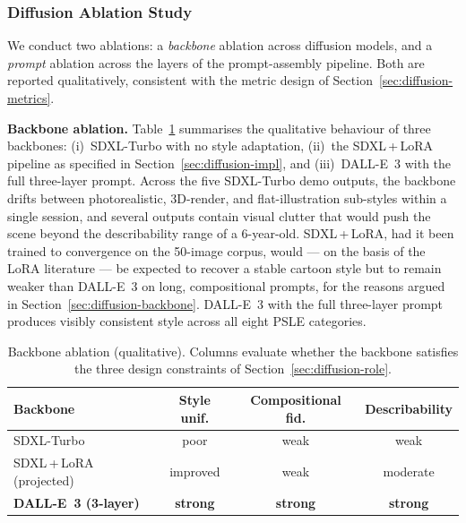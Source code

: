 \documentclass{article}
\begin{document}
\subsubsection{Diffusion Ablation Study}
\label{sec:diffusion-ablation}

We conduct two ablations: a \textit{backbone} ablation across diffusion
models, and a \textit{prompt} ablation across the layers of the
prompt-assembly pipeline. Both are reported qualitatively, consistent
with the metric design of Section~\ref{sec:diffusion-metrics}.

\noindent\textbf{Backbone ablation.}
Table~\ref{tab:diffusion-backbone-abl} summarises the qualitative
behaviour of three backbones: (i)~SDXL-Turbo with no style adaptation,
(ii)~the SDXL\,+\,LoRA pipeline as specified in
Section~\ref{sec:diffusion-impl}, and (iii)~DALL-E~3 with the full
three-layer prompt. Across the five SDXL-Turbo demo outputs, the
backbone drifts between photorealistic, 3D-render, and flat-illustration
sub-styles within a single session, and several outputs contain visual
clutter that would push the scene beyond the describability range of a
6-year-old. SDXL\,+\,LoRA, had it been trained to convergence on the
50-image corpus, would --- on the basis of the LoRA literature ---
be expected to recover a stable cartoon style but to remain weaker than
DALL-E~3 on long, compositional prompts, for the reasons argued in
Section~\ref{sec:diffusion-backbone}. DALL-E~3 with the full
three-layer prompt produces visibly consistent style across all eight
PSLE categories.

\begin{table}[t]
\centering
\caption{Backbone ablation (qualitative). Columns evaluate whether the
backbone satisfies the three design constraints of
Section~\ref{sec:diffusion-role}.}
\label{tab:diffusion-backbone-abl}
\scriptsize
\setlength{\tabcolsep}{4pt}
\begin{tabular}{lccc}
\toprule
\textbf{Backbone} & \textbf{Style unif.} &
\textbf{Compositional fid.} & \textbf{Describability}\\
\midrule
SDXL-Turbo                       & poor      & weak     & weak\\
SDXL\,+\,LoRA (projected)        & improved  & weak     & moderate\\
\textbf{DALL-E~3 (3-layer)}      & \textbf{strong} & \textbf{strong} & \textbf{strong}\\
\bottomrule
\end{tabular}
\end{table}
\end{document}
